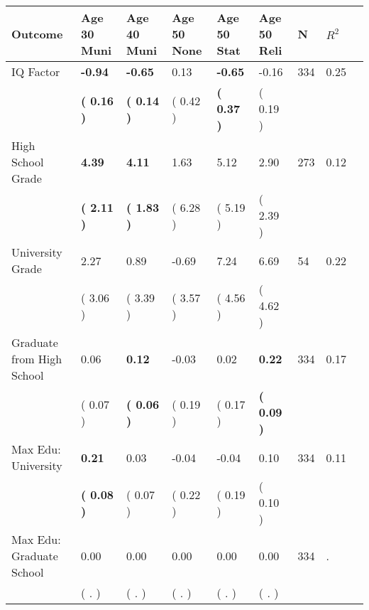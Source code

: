 \begin{tabular}{L{6.2cm} C{1.8cm} C{1.8cm} C{1.8cm} C{1.8cm} C{1.8cm} C{1.8cm} C{0.3cm} C{0.3cm}}
\toprule
 \textbf{Outcome} & \textbf{Age 30 Muni} & \textbf{Age 40 Muni} & \textbf{Age 50 None} & \textbf{Age 50 Stat} & \textbf{Age 50 Reli} & \textbf{N} & \textbf{$ R^2$} \\
\midrule
IQ Factor & \textbf{    -0.94} & \textbf{    -0.65} &      0.13 & \textbf{    -0.65} &     -0.16  & 334 &       0.25 \\ 
 & \textbf{(     0.16 )} & \textbf{(     0.14 )} & (     0.42 ) & \textbf{(     0.37 )} & (     0.19 )  & \\
High School Grade & \textbf{     4.39} & \textbf{     4.11} &      1.63 &      5.12 &      2.90  & 273 &       0.12 \\ 
 & \textbf{(     2.11 )} & \textbf{(     1.83 )} & (     6.28 ) & (     5.19 ) & (     2.39 )  & \\
University Grade &      2.27 &      0.89 &     -0.69 &      7.24 &      6.69  & 54 &       0.22 \\ 
 & (     3.06 ) & (     3.39 ) & (     3.57 ) & (     4.56 ) & (     4.62 )  & \\
Graduate from High School &      0.06 & \textbf{     0.12} &     -0.03 &      0.02 & \textbf{     0.22}  & 334 &       0.17 \\ 
 & (     0.07 ) & \textbf{(     0.06 )} & (     0.19 ) & (     0.17 ) & \textbf{(     0.09 )}  & \\
Max Edu: University & \textbf{     0.21} &      0.03 &     -0.04 &     -0.04 &      0.10  & 334 &       0.11 \\ 
 & \textbf{(     0.08 )} & (     0.07 ) & (     0.22 ) & (     0.19 ) & (     0.10 )  & \\
Max Edu: Graduate School &      0.00 &      0.00 &      0.00 &      0.00 &      0.00  & 334 &          . \\ 
 & (        . ) & (        . ) & (        . ) & (        . ) & (        . )  & \\
\bottomrule
\end{tabular}
